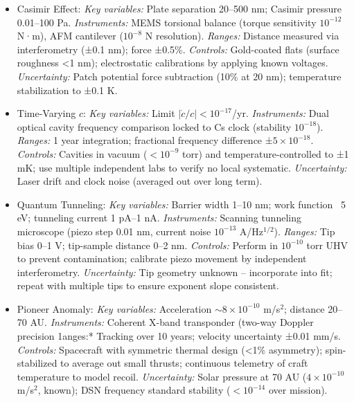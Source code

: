 \documentclass[11pt]{article}
\begin{document}
\begin{itemize}
\item 
Casimir Effect: \textit{Key variables:} Plate separation 20–500 nm; Casimir pressure 0.01–100 Pa. \textit{Instruments:} MEMS torsional balance (torque sensitivity $10^{-12}$ N·m), AFM cantilever ($10^{-8}$ N resolution). \textit{Ranges:} Distance measured via interferometry (±0.1 nm); force ±0.5\%. \textit{Controls:} Gold-coated flats (surface roughness <1 nm); electrostatic calibrations by applying known voltages. \textit{Uncertainty:} Patch potential force subtraction (10\% at 20 nm); temperature stabilization to ±0.1 K.




\item 
Time-Varying $c$: \textit{Key variables:} Limit $|\dot{c}/c| <10^{-17}$/yr. \textit{Instruments:} Dual optical cavity frequency comparison locked to Cs clock (stability $10^{-18}$). \textit{Ranges:} 1 year integration; fractional frequency difference ±$5\times10^{-18}$. \textit{Controls:} Cavities in vacuum ($<10^{-9}$ torr) and temperature-controlled to ±1 mK; use multiple independent labs to verify no local systematic. \textit{Uncertainty:} Laser drift and clock noise (averaged out over long term).




\item 
Quantum Tunneling: \textit{Key variables:} Barrier width 1–10 nm; work function ~5 eV; tunneling current 1 pA–1 nA. \textit{Instruments:} Scanning tunneling microscope (piezo step 0.01 nm, current noise $10^{-13}$ A/Hz$^{1/2}$). \textit{Ranges:} Tip bias 0–1 V; tip-sample distance 0–2 nm. \textit{Controls:} Perform in $10^{-10}$ torr UHV to prevent contamination; calibrate piezo movement by independent interferometry. \textit{Uncertainty:} Tip geometry unknown – incorporate into fit; repeat with multiple tips to ensure exponent slope consistent.




\item 
Pioneer Anomaly: \textit{Key variables:} Acceleration $\sim8\times10^{-10}$ m/s$^2$; distance 20–70 AU. \textit{Instruments:} Coherent X-band transponder (two-way Doppler precision 1anges:* Tracking over 10 years; velocity uncertainty ±0.01 mm/s. \textit{Controls:} Spacecraft with symmetric thermal design (<1\% asymmetry); spin-stabilized to average out small thrusts; continuous telemetry of craft temperature to model recoil. \textit{Uncertainty:} Solar pressure at 70 AU ($4\times10^{-10}$ m/s$^2$, known); DSN frequency standard stability ($<10^{-14}$ over mission).





\end{itemize}
\end{document}

